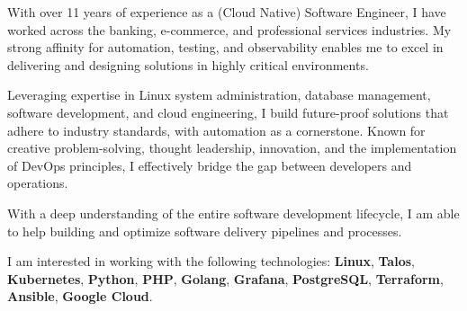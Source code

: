 
\begin{cvparagraph}
With over 11 years of experience as a (Cloud Native) Software Engineer, I have worked across the banking, e-commerce, and professional services industries.
My strong affinity for automation, testing, and observability enables me to excel in delivering and designing solutions in highly critical environments.

Leveraging expertise in Linux system administration, database management, software development, and cloud engineering, 
I build future-proof solutions that adhere to industry standards, with automation as a cornerstone.
Known for creative problem-solving, thought leadership, innovation, and the implementation of DevOps principles, I effectively bridge the gap between developers and operations.

With a deep understanding of the entire software development lifecycle, I am able to help building and optimize software delivery pipelines and processes.

I am interested in working with the following technologies: \textbf{Linux}, \textbf{Talos}, \textbf{Kubernetes}, \textbf{Python}, \textbf{PHP}, \textbf{Golang}, \textbf{Grafana}, \textbf{PostgreSQL}, \textbf{Terraform}, \textbf{Ansible}, \textbf{Google Cloud}.


\end{cvparagraph}

